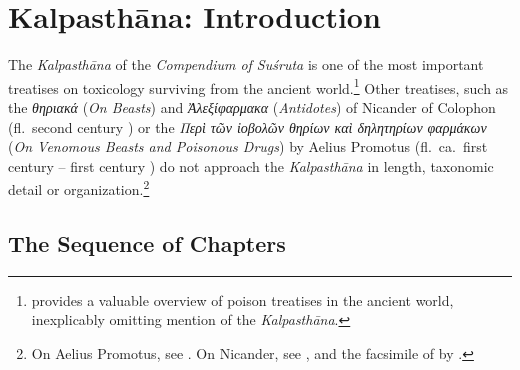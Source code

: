 \chapter{Kalpasthāna: Introduction}

The \emph{Kalpasthāna} of the \emph{Compendium of Suśruta} is one of the most
important treatises on toxicology surviving from the ancient 
world.\footnote{\citet{liu-2021} provides a valuable overview of poison treatises 
in the ancient world, inexplicably omitting mention of the \emph{Kalpasthāna}.} 
Other treatises, such as the
\emph{\textgreek{θηριακά}} (\emph{On Beasts}) and
\emph{\textgreek{Ἀλεξίφαρμακα}} (\emph{Antidotes}) 
of Nicander of Colophon (fl.\ second century \BCE)
or the  
\emph{\textgreek{Περὶ τῶν ἰοβολῶν θηρίων καὶ δηλητηρίων φαρμάκων}} 
(\emph{On Venomous Beasts and Poisonous Drugs})
by Aelius Promotus (fl.\ ca.\ first century \BCE -- first century \CE)
do not approach the \emph{Kalpasthāna} in length, taxonomic detail or
organization.\footnote{On Aelius Promotus, see 
\cites[29]{smit-1870}[363--368]{gost-1897}{ihm-1995}. On
    Nicander, see \cite{gow-1953}, and the facsimile of  by \citet{touw-1997}.}


\section{The Sequence of Chapters}
\label{kalpa-chapter-sequence}

